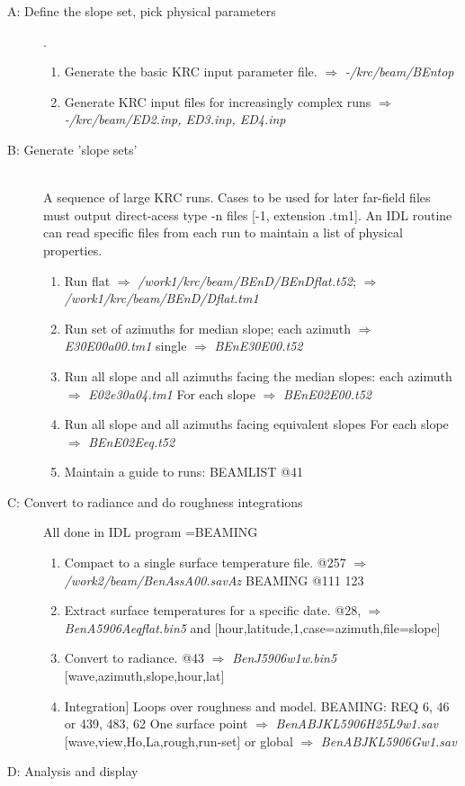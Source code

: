 \documentclass{article}
\newcommand{\qfo}[1]{$\Longrightarrow$ \textit{#1}} %
\begin{document}
\begin{description}  %
\item [A: Define the slope set, pick physical parameters] .\\
\begin{enumerate}    %
\item Generate the basic KRC input parameter file.  \qfo{-/krc/beam/BEntop}
\item Generate KRC input files for increasingly complex runs
 \qfo{-/krc/beam/ED2.inp, ED3.inp, ED4.inp}
\end{enumerate}
 
\item [B: Generate 'slope sets'] \hspace{1.mm}
\\ A sequence of large KRC runs. Cases to be used for later far-field files must output direct-acess type -n files [-1, extension .tm1]. An IDL routine can read specific files from each run to maintain a list of physical properties.
\begin{enumerate}    %
 \item Run flat  \qfo{/work1/krc/beam/BEnD/BEnDflat.t52}; \qfo{/work1/krc/beam/BEnD/Dflat.tm1}
 \item Run set of azimuths for median slope; each azimuth \qfo{E30E00a00.tm1}
\qiii single \qfo{BEnE30E00.t52} 
 \item Run all slope and all azimuths facing the median slopes: each azimuth \qfo{E02e30a04.tm1}
\qiii For each slope \qfo{BEnE02E00.t52}
 \item Run all slope and all azimuths facing equivalent slopes
\qiii For each slope \qfo{BEnE02Eeq.t52}
\item Maintain a guide to runs: BEAMLIST @41
\end{enumerate}

\item [C: Convert to radiance and do roughness integrations] 
All done in IDL program =BEAMING
\begin{enumerate}    %
\item   Compact to a single surface temperature file.
\qi  @257  \qfo{/work2/beam/BenAssA00.savAz} BEAMING @111 123
\item Extract surface temperatures for a specific date.
\qi @28, \qfo{BenA5906Aeqflat.bin5} and    [hour,latitude,1,case=azimuth,file=slope]
\item Convert to radiance.
\qi  @43 \qfo{BenJ5906w1w.bin5} [wave,azimuth,slope,hour,lat] 


\item Integration] Loops over roughness and model.
\qi BEAMING:  REQ  6, 46 or 439, 483, 62
\qi One surface point \qfo{BenABJKL5906H25L9w1.sav}  [wave,view,Ho,La,rough,run-set] 
\qi or global  \qfo{BenABJKL5906Gw1.sav} 
\qi 
\end{enumerate}



\item [D: Analysis and display]
\end{description}
\end{document}
